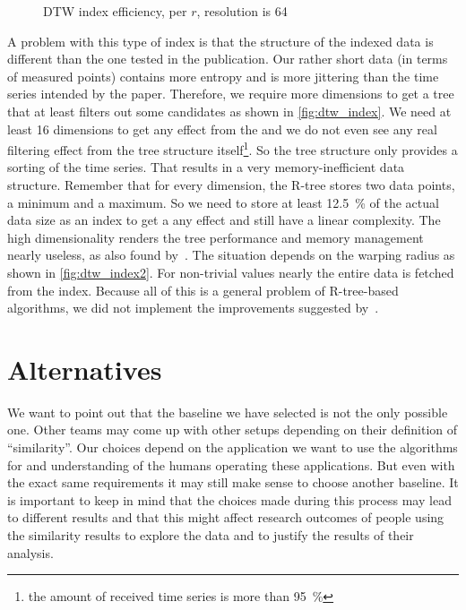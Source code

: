 \begin{figure}
    \centering
    
    \caption{DTW index efficiency, per $r$, resolution is \num{64}}\label{fig:dtw_index2}
\end{figure}

A problem with this type of index is that the structure of the indexed data is different than the one tested in the publication. Our rather short data (in terms of measured points) contains more entropy and is more jittering than the time series intended by the paper. Therefore, we require more dimensions to get a tree that at least filters out some candidates as shown in \autoref{fig:dtw_index}. We need at least \num{16} dimensions to get any effect from the  and we do not even see any real filtering effect from the tree structure itself\footnote{the amount of received time series is more than \SI{95}{\percent}}. So the tree structure only provides a sorting of the time series. That results in a very memory-inefficient data structure. Remember that for every dimension, the R-tree stores two data points, a minimum and a maximum. So we need to store at least \SI{12.5}{\percent} of the actual data size as an index to get a any effect and still have a linear complexity. The high dimensionality renders the tree performance and memory management nearly useless, as also found by~\cite{rtree_highdim}. The situation depends on the warping radius as shown in \autoref{fig:dtw_index2}. For non-trivial values nearly the entire data is fetched from the index. Because all of this is a general problem of R-tree-based algorithms, we did not implement the improvements suggested by~\cite{LB_Improved}.



\section{Alternatives}
\label{sec:baseline:alt}

We want to point out that the baseline we have selected is not the only possible one. Other teams may come up with other setups depending on their definition of \enquote{similarity}. Our choices depend on the application we want to use the algorithms for and understanding of the humans operating these applications. But even with the exact same requirements it may still make sense to choose another baseline. It is important to keep in mind that the choices made during this process may lead to different results and that this might affect research outcomes of people using the similarity results to explore the data and to justify the results of their analysis.
